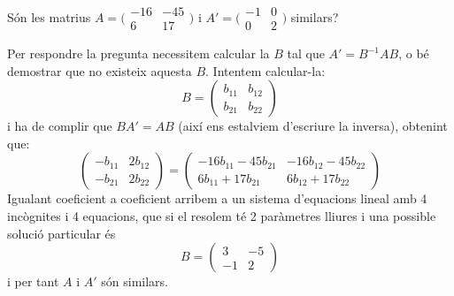 \begin{exemple}
    Són les matrius $A=\big(\begin{smallmatrix}  -16 & -45 \\ 6 & 17\end{smallmatrix}\big)$ i $A'=\big(\begin{smallmatrix} -1 & 0 \\ 0 & 2  \end{smallmatrix}\big)$ similars?
    
    Per respondre la pregunta necessitem calcular la $B$ tal que $A'=B^{-1}AB$, o bé demostrar que no existeix aquesta $B$. Intentem calcular-la:
    $$
    B=\begin{pmatrix} b_{11} & b_{12} \\ b_{21} & b_{22} \end{pmatrix}
    $$
    i ha de complir que $BA'=AB$ (així ens estalviem d'escriure la inversa), obtenint que:
    $$
    \begin{pmatrix}
    -b_{11} & 2b_{12} \\ -b_{21} & 2b_{22}
    \end{pmatrix}
    =
    \begin{pmatrix}
    -16b_{11}-45b_{21} & -16b_{12}-45b_{22}\\ 6b_{11}+17b_{21} & 6b_{12}+17b_{22}
    \end{pmatrix}
    $$
    Igualant coeficient a coeficient arribem a un sistema d'equacions lineal amb 4 incògnites i 4 equacions, que si el resolem té 2 paràmetres lliures i una possible solució particular és
    $$
    B=\begin{pmatrix}
    3 & -5 \\  -1 & 2 
    \end{pmatrix}
    $$
    i per tant $A$ i $A'$ són similars.
\end{exemple}
